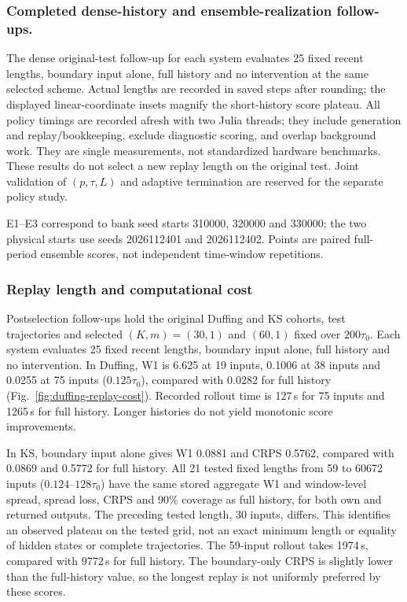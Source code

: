 \documentclass[gmd,manuscript]{copernicus}
\begin{document}
\subsubsection{Completed dense-history and ensemble-realization follow-ups.}
The dense original-test follow-up for each system evaluates 25 fixed recent lengths, boundary input alone, full history and no intervention at the same selected scheme. Actual lengths are recorded in saved steps after rounding; the displayed linear-coordinate insets magnify the short-history score plateau. All policy timings are recorded afresh with two Julia threads; they include generation and replay/bookkeeping, exclude diagnostic scoring, and overlap background work. They are single measurements, not standardized hardware benchmarks. These results do not select a new replay length on the original test. Joint validation of $(p,\tau,L)$ and adaptive termination are reserved for the separate policy study.

E1--E3 correspond to bank seed starts 310000, 320000 and 330000; the two physical starts use seeds 2026112401 and 2026112402. Points are paired full-period ensemble scores, not independent time-window repetitions.

\subsubsection{Replay length and computational cost}
Postselection follow-ups hold the original Duffing and KS cohorts, test trajectories and selected $(K,m)=(30,1)$ and $(60,1)$ fixed over $200\tau_0$. Each system evaluates 25 fixed recent lengths, boundary input alone, full history and no intervention. In Duffing, W1 is 6.625 at 19 inputs, 0.1006 at 38 inputs and 0.0255 at 75 inputs ($0.125\tau_0$), compared with 0.0282 for full history (Fig.~\ref{fig:duffing-replay-cost}). Recorded rollout time is 127\,s for 75 inputs and 1265\,s for full history. Longer histories do not yield monotonic score improvements.

In KS, boundary input alone gives W1 0.0881 and CRPS 0.5762, compared with 0.0869 and 0.5772 for full history. All 21 tested fixed lengths from 59 to 60672 inputs ($0.124$--$128\tau_0$) have the same stored aggregate W1 and window-level spread, spread loss, CRPS and 90\% coverage as full history, for both own and returned outputs. The preceding tested length, 30 inputs, differs. This identifies an observed plateau on the tested grid, not an exact minimum length or equality of hidden states or complete trajectories. The 59-input rollout takes 1974\,s, compared with 9772\,s for full history. The boundary-only CRPS is slightly lower than the full-history value, so the longest replay is not uniformly preferred by these scores.
\end{document}
